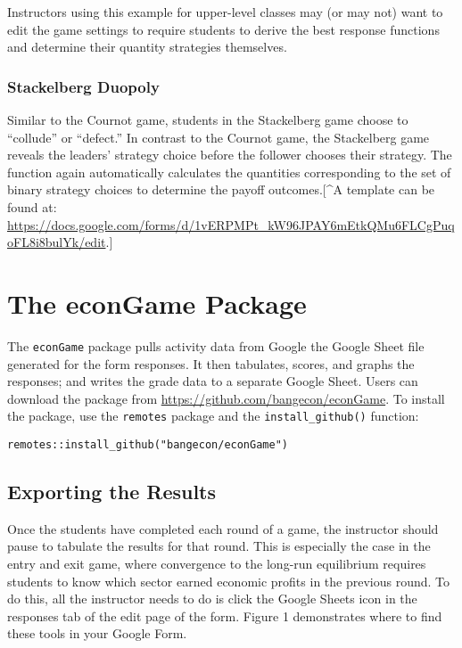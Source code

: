 \documentclass[
]{article}
\begin{document}
Instructors using this example for upper-level classes may (or may not)
want to edit the game settings to require students to derive the best
response functions and determine their quantity strategies themselves.

\hypertarget{stackelberg-duopoly}{%
\subsubsection{Stackelberg Duopoly}\label{stackelberg-duopoly}}

Similar to the Cournot game, students in the Stackelberg game choose to
``collude'' or ``defect.'' In contrast to the Cournot game, the
Stackelberg game reveals the leaders' strategy choice before the
follower chooses their strategy. The function again automatically
calculates the quantities corresponding to the set of binary strategy
choices to determine the payoff outcomes.{[}\^{}A template can be found
at:
\url{https://docs.google.com/forms/d/1vERPMPt_kW96JPAY6mEtkQMu6FLCgPuqoFL8i8bulYk/edit}.{]}

\hypertarget{the-econgame-package}{%
\section{The econGame Package}\label{the-econgame-package}}

The \texttt{econGame} package pulls activity data from Google the Google
Sheet file generated for the form responses. It then tabulates, scores,
and graphs the responses; and writes the grade data to a separate Google
Sheet. Users can download the package from
\url{https://github.com/bangecon/econGame}. To install the package, use
the \texttt{remotes} package and the \texttt{install\_github()}
function:

\texttt{remotes::install\_github("bangecon/econGame")}

\hypertarget{exporting-the-results}{%
\subsection{Exporting the Results}\label{exporting-the-results}}

Once the students have completed each round of a game, the instructor
should pause to tabulate the results for that round. This is especially
the case in the entry and exit game, where convergence to the long-run
equilibrium requires students to know which sector earned economic
profits in the previous round. To do this, all the instructor needs to
do is click the Google Sheets icon in the responses tab of the edit page
of the form. Figure 1 demonstrates where to find these tools in your
Google Form.
\end{document}
